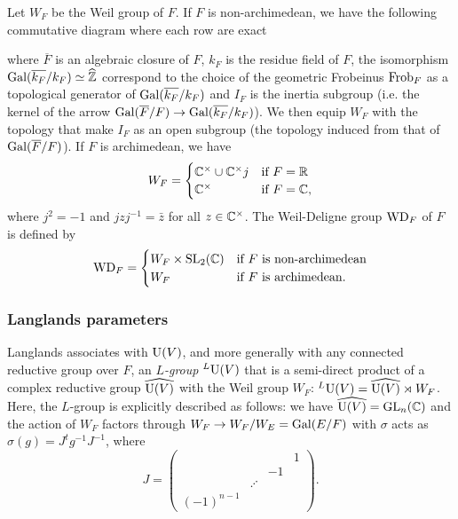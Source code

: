 Let $W_F$ be the Weil group of $F$.
If $F$ is non-archimedean, we have the following commutative diagram where each row are exact
\begin{center}
\end{center}
where $\overline{F}$ is an algebraic closure of $F$, $k_F$ is the residue field of $F$, the isomorphism $\mathrm{Gal}(\overline{k_F} / k_F) \simeq \widehat{\mathbb{Z}}$ correspond to the choice of the geometric Frobeinus $\mathrm{Frob}_F$ as a topological generator of $\mathrm{Gal}(\overline{k_F} / k_F)$ and $I_F$ is the inertia subgroup (i.e. the kernel of the arrow $\mathrm{Gal}(\overline{F}/ F) \to \mathrm{Gal}(\overline{k_F} / k_F)$).
We then equip $W_F$ with the topology that make $I_F$ as an open subgroup (the topology induced from that of $\mathrm{Gal}(\overline{F} / F)$).
If $F$ is archimedean, we have
\[
    W_F = \begin{cases} \mathbb{C}^\times \cup \mathbb{C}^\times j & \text{if }F = \mathbb{R} \\ \mathbb{C}^\times & \text{if }F = \mathbb{C},
\end{cases}
\]
where $j^2 = -1$ and $jzj^{-1} = \bar{z}$ for all $z \in \mathbb{C}^\times$.
The Weil-Deligne group $\mathrm{WD}_F$ of $F$ is defined by 
\[
    \mathrm{WD}_F = \begin{cases} W_F \times \mathrm{SL}_2(\mathbb{C}) & \text{if }F\text{ is non-archimedean} \\ W_F & \text{if }F \text{ is archimedean}. \end{cases}
\]


\subsubsection{Langlands parameters}

Langlands associates with $\mathrm{U}(V)$, and more generally with any connected reductive group over $F$, an \emph{$L$-group} ${}^L \mathrm{U}(V)$ that is a semi-direct product of a complex reductive group $\widehat{\mathrm{U}(V)}$ with the Weil group $W_F$: ${}^L \mathrm{U}(V) = \widehat{\mathrm{U}(V)} \rtimes W_F$.
Here, the $L$-group is explicitly described as follows: we have $\widehat{\mathrm{U}(V)} = \mathrm{GL}_n(\mathbb{C})$ and the action of $W_F$ factors through $W_F \to W_F / W_E = \mathrm{Gal}(E/F)$ with $\sigma$ acts as $\sigma(g) = J^{t}g^{-1} J^{-1}$, where
\[
J = \begin{pmatrix} & & & 1 \\
& & -1 & \\
& \iddots & & \\
(-1)^{n-1} & & & 
\end{pmatrix}.
\]

